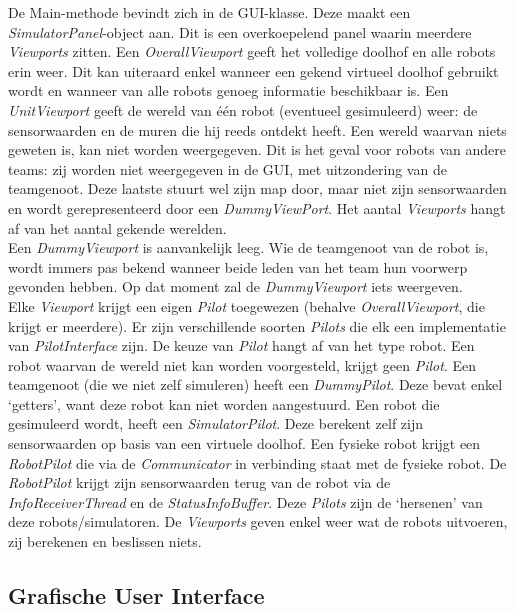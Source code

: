 \documentclass[tt2]{penoverslag}
\begin{document}
De Main-methode bevindt zich in de GUI-klasse. Deze maakt een \textit{SimulatorPanel}-object aan. Dit is een overkoepelend panel waarin meerdere \textit{Viewports} zitten. Een \textit{OverallViewport} geeft het volledige doolhof en alle robots erin weer. Dit kan uiteraard enkel wanneer een gekend virtueel doolhof gebruikt wordt en wanneer van alle robots genoeg informatie beschikbaar is. Een \textit{UnitViewport} geeft de wereld van \'e\'en robot (eventueel gesimuleerd) weer: de sensorwaarden en de muren die hij reeds ontdekt heeft. Een wereld waarvan niets geweten is, kan niet worden weergegeven. Dit is het geval voor robots van andere teams: zij worden niet weergegeven in de GUI, met uitzondering van de teamgenoot. Deze laatste stuurt wel zijn map door, maar niet zijn sensorwaarden en wordt gerepresenteerd door een \textit{DummyViewPort}. Het aantal \textit{Viewports} hangt af van het aantal gekende werelden.\\

Een \textit{DummyViewport} is aanvankelijk leeg. Wie de teamgenoot van de robot is, wordt immers pas bekend wanneer beide leden van het team hun voorwerp gevonden hebben. Op dat moment zal de \textit{DummyViewport} iets weergeven.\\

Elke \textit{Viewport} krijgt een eigen \textit{Pilot} toegewezen (behalve \textit{OverallViewport}, die krijgt er meerdere). Er zijn verschillende soorten \textit{Pilots} die elk een implementatie van \textit{PilotInterface} zijn. De keuze van \textit{Pilot} hangt af van het type robot. Een robot waarvan de wereld niet kan worden voorgesteld, krijgt geen \textit{Pilot}. Een teamgenoot (die we niet zelf simuleren) heeft een \textit{DummyPilot}. Deze bevat enkel `getters', want deze robot kan niet worden aangestuurd. Een robot die gesimuleerd wordt, heeft een \textit{SimulatorPilot}. Deze berekent zelf zijn sensorwaarden op basis van een virtuele doolhof. Een fysieke robot krijgt een \textit{RobotPilot} die via de \textit{Communicator} in verbinding staat met de fysieke robot. De \textit{RobotPilot} krijgt zijn sensorwaarden terug van de robot via de \textit{InfoReceiverThread} en de \textit{StatusInfoBuffer}. Deze \textit{Pilots} zijn de `hersenen' van deze robots/simulatoren. De \textit{Viewports} geven enkel weer wat de robots uitvoeren, zij berekenen en beslissen niets.

\subsection{Grafische User Interface}
\label{ssec:GUI}
\end{document}
